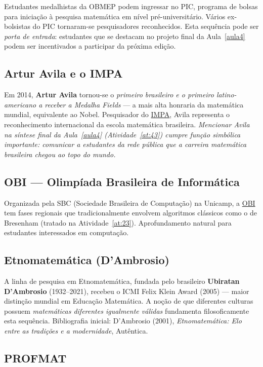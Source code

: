\documentclass[12pt,a4paper]{scrartcl}
\newcommand{\acc}[1]{\textcolor{accent}{\textbf{#1}}}
\begin{document}
Estudantes medalhistas da OBMEP podem ingressar no PIC, programa de bolsas para iniciação à pesquisa matemática em nível pré-universitário. Vários ex-bolsistas do PIC tornaram-se pesquisadores reconhecidos. Esta sequência pode ser \emph{porta de entrada}: estudantes que se destacam no projeto final da Aula~\ref{aula4} podem ser incentivados a participar da próxima edição.

\subsection{Artur Avila e o IMPA}

Em 2014, \acc{Artur Avila} tornou-se o \emph{primeiro brasileiro e o primeiro latino-americano a receber a Medalha Fields} --- a mais alta honraria da matemática mundial, equivalente ao Nobel. Pesquisador do \href{https://impa.br/}{IMPA}, Avila representa o reconhecimento internacional da escola matemática brasileira. \emph{Mencionar Avila na síntese final da Aula~\ref{aula4} (Atividade~\ref{at:43}) cumpre função simbólica importante: comunicar a estudantes da rede pública que a carreira matemática brasileira chegou ao topo do mundo.}

\subsection{OBI --- Olimpíada Brasileira de Informática}

Organizada pela SBC (Sociedade Brasileira de Computação) na Unicamp, a \href{https://olimpiada.ic.unicamp.br/}{OBI} tem fases regionais que tradicionalmente envolvem algoritmos clássicos como o de Bresenham (tratado na Atividade~\ref{at:23}). Aprofundamento natural para estudantes interessados em computação.

\subsection{Etnomatemática (D'Ambrosio)}

A linha de pesquisa em Etnomatemática, fundada pelo brasileiro \acc{Ubiratan D'Ambrosio} (1932--2021), recebeu o ICMI Felix Klein Award (2005) --- maior distinção mundial em Educação Matemática. A noção de que diferentes culturas possuem \emph{matemáticas diferentes igualmente válidas} fundamenta filosoficamente esta sequência. Bibliografia inicial: D'Ambrosio (2001), \emph{Etnomatemática: Elo entre as tradições e a modernidade}, Autêntica.

\subsection{PROFMAT}
\end{document}
